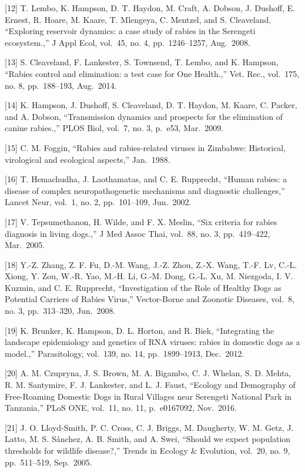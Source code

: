 \documentclass[
]{book}
\begin{document}
{[}12{]} T. Lembo, K. Hampson, D. T. Haydon, M. Craft, A. Dobson, J. Dushoff, E. Ernest, R. Hoare, M. Kaare, T. Mlengeya, C. Mentzel, and S. Cleaveland, ``Exploring reservoir dynamics: a case study of rabies in the Serengeti ecosystem.,'' J Appl Ecol, vol.~45, no. 4, pp.~1246--1257, Aug.~2008.

{[}13{]} S. Cleaveland, F. Lankester, S. Townsend, T. Lembo, and K. Hampson, ``Rabies control and elimination: a test case for One Health.,'' Vet. Rec., vol.~175, no. 8, pp.~188--193, Aug.~2014.

{[}14{]} K. Hampson, J. Dushoff, S. Cleaveland, D. T. Haydon, M. Kaare, C. Packer, and A. Dobson, ``Transmission dynamics and prospects for the elimination of canine rabies.,'' PLOS Biol, vol.~7, no. 3, p.~e53, Mar.~2009.

{[}15{]} C. M. Foggin, ``Rabies and rabies-related viruses in Zimbabwe: Historical, virological and ecological aspects,'' Jan.~1988.

{[}16{]} T. Hemachudha, J. Laothamatas, and C. E. Rupprecht, ``Human rabies: a disease of complex neuropathogenetic mechanisms and diagnostic challenges,'' Lancet Neur, vol.~1, no. 2, pp.~101--109, Jun.~2002.

{[}17{]} V. Tepsumethanon, H. Wilde, and F. X. Meslin, ``Six criteria for rabies diagnosis in living dogs.,'' J Med Assoc Thai, vol.~88, no. 3, pp.~419--422, Mar.~2005.

{[}18{]} Y.-Z. Zhang, Z. F. Fu, D.-M. Wang, J.-Z. Zhou, Z.-X. Wang, T.-F. Lv, C.-L. Xiong, Y. Zou, W.-R. Yao, M.-H. Li, G.-M. Dong, G.-L. Xu, M. Niezgoda, I. V. Kuzmin, and C. E. Rupprecht, ``Investigation of the Role of Healthy Dogs as Potential Carriers of Rabies Virus,'' Vector-Borne and Zoonotic Diseases, vol.~8, no. 3, pp.~313--320, Jun.~2008.

{[}19{]} K. Brunker, K. Hampson, D. L. Horton, and R. Biek, ``Integrating the landscape epidemiology and genetics of RNA viruses: rabies in domestic dogs as a model.,'' Parasitology, vol.~139, no. 14, pp.~1899--1913, Dec.~2012.

{[}20{]} A. M. Czupryna, J. S. Brown, M. A. Bigambo, C. J. Whelan, S. D. Mehta, R. M. Santymire, F. J. Lankester, and L. J. Faust, ``Ecology and Demography of Free-Roaming Domestic Dogs in Rural Villages near Serengeti National Park in Tanzania,'' PLoS ONE, vol.~11, no. 11, p.~e0167092, Nov.~2016.

{[}21{]} J. O. Lloyd-Smith, P. C. Cross, C. J. Briggs, M. Daugherty, W. M. Getz, J. Latto, M. S. Sánchez, A. B. Smith, and A. Swei, ``Should we expect population thresholds for wildlife disease?,'' Trends in Ecology \& Evolution, vol.~20, no. 9, pp.~511--519, Sep.~2005.
\end{document}
